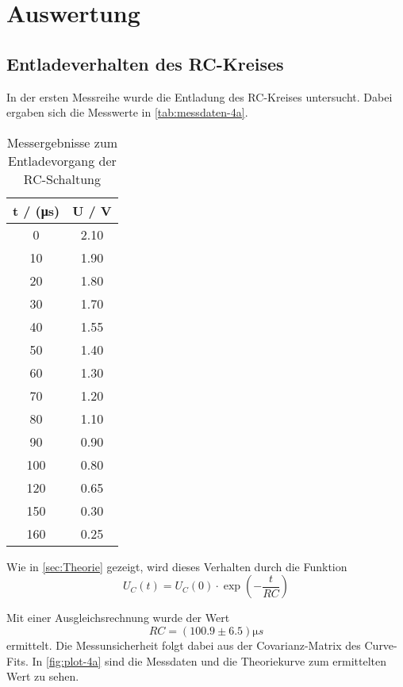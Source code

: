 \section{Auswertung}
\label{sec:Auswertung}

\subsection{Entladeverhalten des RC-Kreises}
\label{sec:4a-auswertung}

In der ersten Messreihe wurde die Entladung des RC-Kreises untersucht. Dabei ergaben sich
die Messwerte in \autoref{tab:messdaten-4a}.

\begin{table}
	\centering
	\caption{Messergebnisse zum Entladevorgang der RC-Schaltung}
	\label{tab:messdaten-4a}
	\begin{tabular}{c c}
		\toprule
		t / (\si{\micro s}) & U / \si{\volt} \\
		\midrule
		0  	&2.10 \\
		10  	&1.90 \\
		20  	&1.80 \\
		30  	&1.70 \\
		40  	&1.55 \\
		50  	&1.40 \\
		60  	&1.30 \\
		70  	&1.20 \\
		80  	&1.10 \\
		90  	&0.90 \\
		100  	&0.80 \\
		120  	&0.65 \\
		150  	&0.30 \\
		160  	&0.25 \\
		\bottomrule
	\end{tabular}
\end{table}

Wie in \autoref{sec:Theorie} gezeigt, wird dieses Verhalten durch die Funktion
\begin{equation}
	U_C(t) = U_C(0) \cdot \exp\left(-\frac{t}{RC}\right)
\end{equation}

Mit einer Ausgleichsrechnung wurde der Wert
\begin{equation}
	RC = (100.9 \pm 6.5) \si{\micro s}
	\label{eqn:ergebnis-4a}
\end{equation}
ermittelt. Die Messunsicherheit folgt dabei aus der Covarianz-Matrix des Curve-Fits.
In \autoref{fig:plot-4a} sind die Messdaten und die Theoriekurve zum ermittelten Wert zu sehen.

